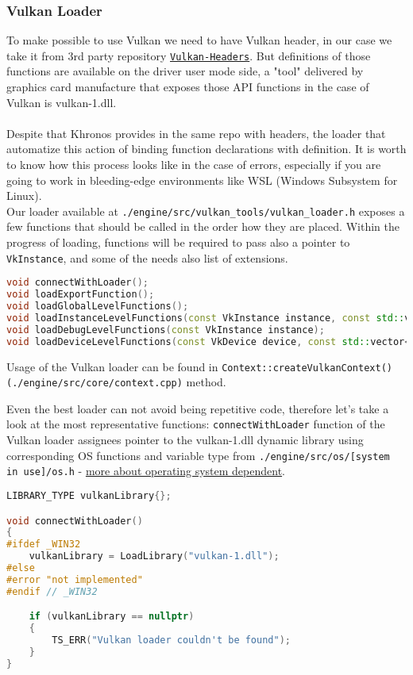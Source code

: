 \newpage

\subsubsection{Vulkan Loader}
\label{sec:vkLoader}
To make possible to use Vulkan we need to have Vulkan header, in our case we take it from 3rd party repository  \hyperref[sec:3rdparty]{\texttt{Vulkan-Headers}}. But definitions of those functions are available on the driver user mode side, a "tool" delivered by graphics card manufacture that exposes those API functions in the case of Vulkan is vulkan-1.dll.\\\\
Despite that Khronos provides in the same repo with headers, the loader that automatize this action of binding function declarations with definition. It is worth to know how this process looks like in the case of errors, especially if you are going to work in bleeding-edge environments like WSL (Windows Subsystem for Linux).\\
Our loader available at \texttt{./engine/src/vulkan\_tools/vulkan\_loader.h} exposes a few functions that should be called in the order how they are placed. Within the progress of loading, functions will be required to pass also a pointer to \texttt{VkInstance}, and some of the needs also list of extensions.
\begin{lstlisting}[language=c++, caption=(./engine/src/vulkan\_tools/vulkan\_loader.h)]
void connectWithLoader();
void loadExportFunction();
void loadGlobalLevelFunctions();
void loadInstanceLevelFunctions(const VkInstance instance, const std::vector<std::string>& vulkanInstanceExtensions);
void loadDebugLevelFunctions(const VkInstance instance);
void loadDeviceLevelFunctions(const VkDevice device, const std::vector<std::string>& enabledVulkanDeviceExtensions);
\end{lstlisting}
Usage of the Vulkan loader can be found in \texttt{Context::createVulkanContext() (./engine/src/core/context.cpp)} method.

Even the best loader can not avoid being repetitive code, therefore let's take a look at the most representative functions:
\texttt{connectWithLoader} function of the Vulkan loader assignees pointer to the vulkan-1.dll dynamic library using corresponding OS functions and variable type from \texttt{./engine/src/os/[system in use]/os.h} -  \hyperref[sec:os]{more about operating system dependent}.
\begin{lstlisting}[language=c++, caption=Connecting with the Vulkan-1.dll (./engine/src/vulkan\_tools/vulkan\_loader.cpp)]
LIBRARY_TYPE vulkanLibrary{};

void connectWithLoader()
{
#ifdef _WIN32
    vulkanLibrary = LoadLibrary("vulkan-1.dll");
#else
#error "not implemented"
#endif // _WIN32

    if (vulkanLibrary == nullptr)
    {
        TS_ERR("Vulkan loader couldn't be found");
    }
}
\end{lstlisting}

